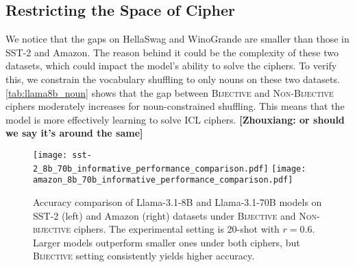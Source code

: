 \documentclass[11pt]{article}
\newcommand{\fzx}[1]{\textbf{\color{blue}[{\bf Zhouxiang}: #1]}}
\newcommand{\aayush}[1]{{\color{green}[{\bf Aayush}: #1]}}
\newcommand{\name}{\textsc{ICL Ciphers}}
\begin{document}
\subsection{Restricting the Space of Cipher}
\label{sec:noun:experiments}
We notice that the gaps on HellaSwag and WinoGrande are smaller than those in SST-2 and Amazon. The reason behind it could be the complexity of these two datasets, which could impact the model's ability to solve the ciphers.
To verify this, we constrain the vocabulary shuffling to only nouns on these two datasets.
\autoref{tab:llama8b_noun} shows that the gap between \textsc{Bijective} and \textsc{Non-Bijective} ciphers moderately increases for noun-constrained shuffling. This means that the model is more effectively learning to solve ICL ciphers.
\fzx{or should we say it's around the same}



\begin{figure*}[h]
\centering
\texttt{[image: sst-2\_8b\_70b\_informative\_performance\_comparison.pdf]}
\texttt{[image: amazon\_8b\_70b\_informative\_performance\_comparison.pdf]}
\caption{Accuracy comparison of Llama-3.1-8B and Llama-3.1-70B models on SST-2 (left) and Amazon (right) datasets under \textsc{Bijective} and \textsc{Non-bijective} ciphers. The experimental setting is 20-shot with $r=0.6$. Larger models outperform smaller ones under both ciphers, but
\textsc{Bijective} setting consistently yields higher accuracy.
}
\label{fig:model_size}
\end{figure*}

\end{document}
